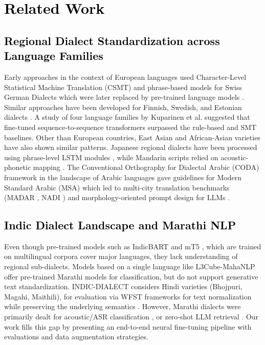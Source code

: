 \documentclass[11pt, a4paper]{article}
\begin{document}
\section{\textcolor{black}{Related Work}}
\label{sec:related}

\subsection{\textcolor{black}{Regional Dialect Standardization across Language Families}}
Early approaches in the context of European languages used Character-Level Statistical Machine Translation (CSMT) and phrase-based models for Swiss German Dialects \citep{scherrer2016swiss} which were later replaced by pre-trained language models \citep{lusetti2018impact,kresic2024normalizing}. Similar approaches have been developed for Finnish, Swedish, and Estonian dialects \citep{partanen2019dialect,hamalainen2020normalizing,hamalainen2022generating}. A study of four language families by Kuparinen et al. \citep{kuparinen2023dialect} suggested that fine-tuned sequence-to-sequence transformers surpassed the rule-based and SMT baselines. Other than European countries, East Asian and African-Asian varieties have also shown similar patterns. Japanese regional dialects have been processed using phrase-level LSTM modules \citep{abe2018multi}, while Mandarin scripts relied on acoustic-phonetic mapping \citep{zhao2022mandarin}. The Conventional Orthography for Dialectal Arabic (CODA) framework \citep{habash2012coda} in the landscape of Arabic languages gave guidelines for Modern Standard Arabic (MSA) which led to multi-city translation benchmarks (MADAR \citep{bouamor2018madar}, NADI \citep{abdulmageed2023nadi}) and morphology-oriented prompt design for LLMs \citep{eryani2020arabic,dimakis2025dialect}.

\subsection{\textcolor{black}{Indic Dialect Landscape and Marathi NLP}}
Even though pre-trained models such as IndicBART \citep{dabre2022indicbart} and mT5 \citep{xue2021mt5}, which are trained on multilingual corpora cover major languages, they lack understanding of regional sub-dialects. Models based on a single language like L3Cube-MahaNLP \citep{joshi2022l3cube} offer pre-trained Marathi models for classification, but do not support generative text standardization. INDIC-DIALECT \citep{kumar2024indicdialect} considers Hindi varieties (Bhojpuri, Magahi, Maithili), for evaluation via WFST frameworks for text normalization while preserving the underlying semantics \citep{pratap2024wfst}. However, Marathi dialects were primarily dealt for acoustic/ASR classification \citep{mulla2022text,pawar2026automatic}, or zero-shot LLM retrieval \citep{gaikwad2025marathi,vyavhare2026marathi}. Our work fills this gap by presenting an end-to-end neural fine-tuning pipeline with evaluations and data augmentation strategies.
\end{document}
